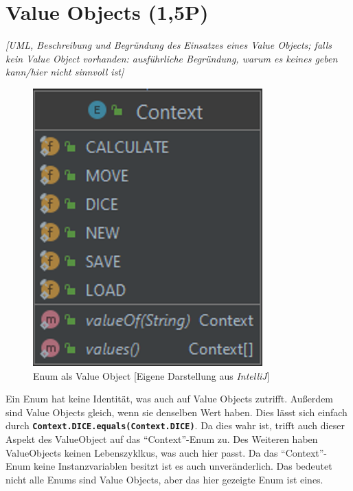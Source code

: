 \newpage
\section{Value Objects (1,5P)}
\emph{[UML, Beschreibung und Begründung des Einsatzes eines Value Objects; falls kein Value Object
vorhanden: ausführliche Begründung, warum es keines geben kann/hier nicht sinnvoll ist]}

\begin{figure}[htbp]
\centering
\centerline{\includegraphics[scale=.6]{valueobjects}}
\caption{Enum als Value Object [Eigene Darstellung aus \emph{IntelliJ}]}
\label{fig:valueobjects}
\end{figure}

\noindent Ein Enum hat keine Identität, was auch auf Value Objects zutrifft. Außerdem sind Value Objects gleich, wenn sie denselben Wert haben. Dies lässt sich einfach durch \textbf{\texttt{Context.DICE.equals(Context.DICE)}}. Da dies wahr ist, trifft auch dieser Aspekt des ValueObject auf das \enquote{Context}-Enum zu. Des Weiteren haben ValueObjects keinen Lebenszyklkus, was auch hier passt. Da das \enquote{Context}-Enum keine Instanzvariablen besitzt ist es auch unveränderlich. Das bedeutet nicht alle Enums sind Value Objects, aber das hier gezeigte Enum ist eines.


